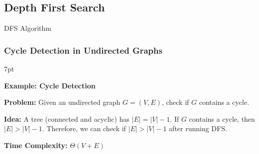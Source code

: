 \documentclass[10pt]{article}
\newenvironment{formal}[2]{%
	\def\FrameCommand{%
		\hspace{1pt}%
		{\color{#1}\vrule width 2pt}%
		{\color{#2}\vrule width 4pt}%
		\colorbox{#2}%
	}%
	\MakeFramed{\advance\hsize-\width\FrameRestore}%
	\noindent\hspace{-4.55pt}%
	\begin{adjustwidth}{}{7pt}%
		\vspace{2pt}\vspace{2pt}%
	}
	{%
		\vspace{2pt}\end{adjustwidth}\endMakeFramed%
}
\begin{document}
\subsection{Depth First Search}

\begin{algorithm}
	\SetAlgoLined

	\vspace*{1em}
	
	
	\caption{DFS Algorithm}

\end{algorithm}

\subsubsection{Cycle Detection in Undirected Graphs}

\begin{formal}{Brown}{brownshade}
	
	\textbf{Example: Cycle Detection}

	\textbf{Problem:} Given an undirected graph $G = (V, E)$, check if $G$ contains a cycle.

	\textbf{Idea:} A tree (connected and acyclic) has $|E| = |V| - 1$. If $G$ contains a cycle, then $|E| > |V| - 1$. Therefore, we can check if $|E| > |V| - 1$ after running DFS.

	\textbf{Time Complexity:} $\Theta(V+E)$

\end{formal}
\end{document}
